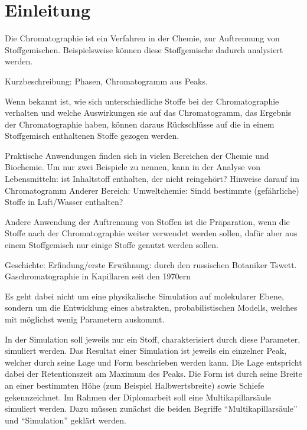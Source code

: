 \label{chapter:ein}

\chapter{Einleitung}


Die Chromatographie ist ein Verfahren in der Chemie, zur Auftrennung von Stoffgemischen. Beispielsweise können diese Stoffgemische dadurch analysiert werden. 

Kurzbeschreibung: Phasen, Chromatogramm aus Peaks.

Wenn bekannt ist, wie sich unterschiedliche Stoffe bei der Chromatographie verhalten und welche Auswirkungen sie auf das Chromatogramm, das Ergebnis der Chromatographie haben, können daraus Rückschlüsse auf die in einem Stoffgemisch enthaltenen Stoffe gezogen werden. 

Praktische Anwendungen finden sich in vielen Bereichen der Chemie und Biochemie. 
Um nur zwei Beispiele zu nennen, kann in der Analyse von Lebensmitteln: ist Inhaltstoff enthalten, der nicht reingehört? Hinweise darauf im Chromatogramm
Anderer Bereich: Umweltchemie: Sindd bestimmte (gefährliche) Stoffe in Luft/Wasser enthalten?
  
Andere Anwendung der Auftrennung von Stoffen ist die Präparation, wenn die Stoffe nach der Chromatographie weiter verwendet werden sollen, dafür aber aus einem Stoffgemisch nur einige Stoffe genutzt werden sollen.

Geschichte: Erfindung/erste Erwähnung: durch den russischen Botaniker Tswett. Gaschromatographie in Kapillaren seit den 1970ern




Es geht dabei nicht um eine physikalische Simulation auf molekularer Ebene, sondern um die Entwicklung eines abstrakten, probabilistischen Modells, welches mit möglichst wenig Parametern auskommt. 

In der Simulation soll jeweils nur ein Stoff, charakterisiert durch diese Parameter, simuliert werden. Das Resultat einer Simulation ist jeweils ein einzelner Peak, welcher durch seine Lage und Form beschrieben werden kann. Die Lage entspricht dabei der Retentionszeit am Maximum des Peaks. Die Form ist durch seine Breite an einer bestimmten Höhe (zum Beispiel Halbwertsbreite) sowie Schiefe gekennzeichnet.
Im Rahmen der Diplomarbeit soll eine Multikapillarsäule simuliert werden. Dazu müssen zunächst die beiden Begriffe ``Multikapillarsäule'' und ``Simulation'' geklärt werden.
